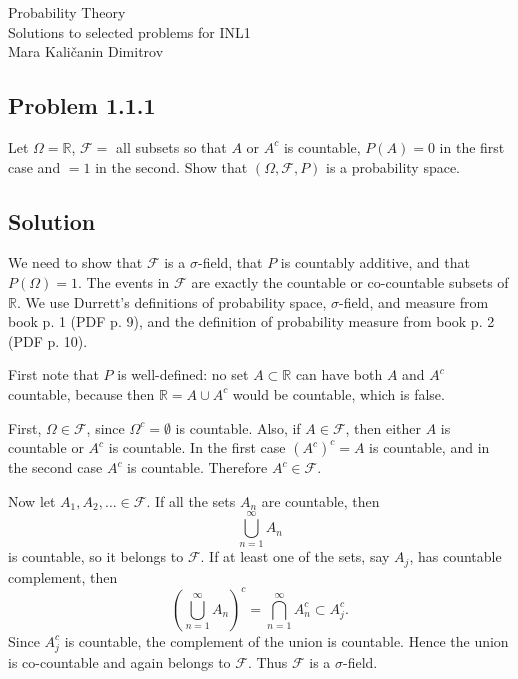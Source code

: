 \documentclass[a4paper,12pt,openany]{article}
\theoremstyle{plain}
\theoremstyle{definition}
\begin{document}
\begin{center}
\huge Probability Theory\\
\vspace{0.2cm}
\Large Solutions to selected problems for INL1 \\ \vspace{0.5cm}
Mara Kali\v{c}anin Dimitrov
\vspace{0.5cm}
\end{center}

\subsection*{Problem 1.1.1}

Let $\Omega = \mathbb{R}$, $\mathcal{F} =$ all subsets so that $A$ or $A^c$ is countable, $P(A) = 0$ in the first case and $= 1$ in the second. Show that $(\Omega, \mathcal{F}, P)$ is a probability space.

\subsection*{Solution}

We need to show that $\mathcal{F}$ is a $\sigma$-field, that $P$ is countably additive, and that $P(\Omega)=1$. The events in $\mathcal{F}$ are exactly the countable or co-countable subsets of $\mathbb{R}$. We use Durrett's definitions of probability space, $\sigma$-field, and measure from book p. 1 (PDF p. 9), and the definition of probability measure from book p. 2 (PDF p. 10).

First note that $P$ is well-defined: no set $A\subset\mathbb{R}$ can have both $A$ and $A^c$ countable, because then $\mathbb{R}=A\cup A^c$ would be countable, which is false.

\medskip

First, $\Omega\in\mathcal{F}$, since $\Omega^c=\emptyset$ is countable. Also, if $A\in\mathcal{F}$, then either $A$ is countable or $A^c$ is countable. In the first case $(A^c)^c=A$ is countable, and in the second case $A^c$ is countable. Therefore $A^c\in\mathcal{F}$.

\medskip

Now let $A_1,A_2,\ldots\in\mathcal{F}$. If all the sets $A_n$ are countable, then
\[
\bigcup_{n=1}^{\infty} A_n
\]
is countable, so it belongs to $\mathcal{F}$. If at least one of the sets, say $A_j$, has countable complement, then
\[
\left(\bigcup_{n=1}^{\infty} A_n\right)^c
=
\bigcap_{n=1}^{\infty} A_n^c
\subset A_j^c.
\]
Since $A_j^c$ is countable, the complement of the union is countable. Hence the union is co-countable and again belongs to $\mathcal{F}$. Thus $\mathcal{F}$ is a $\sigma$-field.
\end{document}
